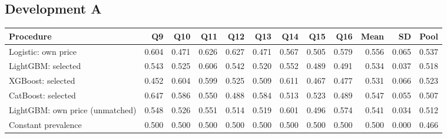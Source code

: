 \subsection*{Development A}
\begingroup\scriptsize\setlength{\tabcolsep}{2.5pt}
\begin{longtable}{@{}p{.26\linewidth}rrrrrrrrrrr@{}}\toprule
Procedure & Q9 & Q10 & Q11 & Q12 & Q13 & Q14 & Q15 & Q16 & Mean & SD & Pool\\\midrule\endhead
Logistic: own price & 0.604 & 0.471 & 0.626 & 0.627 & 0.471 & 0.567 & 0.505 & 0.579 & 0.556 & 0.065 & 0.537\\
LightGBM: selected & 0.543 & 0.525 & 0.606 & 0.542 & 0.520 & 0.552 & 0.489 & 0.491 & 0.534 & 0.037 & 0.518\\
XGBoost: selected & 0.452 & 0.604 & 0.599 & 0.525 & 0.509 & 0.611 & 0.467 & 0.477 & 0.531 & 0.066 & 0.523\\
CatBoost: selected & 0.647 & 0.586 & 0.550 & 0.488 & 0.584 & 0.513 & 0.523 & 0.489 & 0.547 & 0.055 & 0.507\\
LightGBM: own price (unmatched) & 0.548 & 0.526 & 0.551 & 0.514 & 0.519 & 0.601 & 0.496 & 0.574 & 0.541 & 0.034 & 0.512\\
Constant prevalence & 0.500 & 0.500 & 0.500 & 0.500 & 0.500 & 0.500 & 0.500 & 0.500 & 0.500 & 0.000 & 0.466\\
\bottomrule\end{longtable}\endgroup
